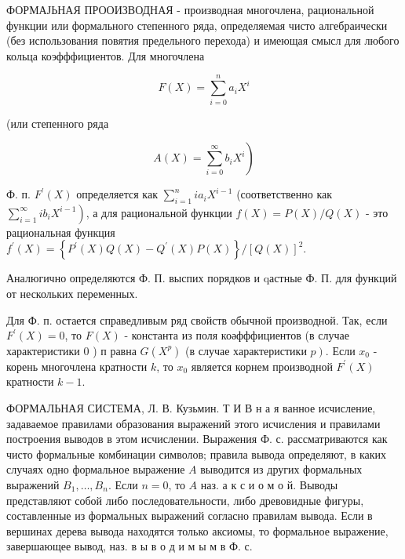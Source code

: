 \documentclass[10pt]{article}
\begin{document}
ФОРМАЈЬНАЯ ПРООИЗВОДНАЯ - производная многочлена, рациональной функции или формального степенного ряда, определяемая чисто алгебраически (без использования повятия предельного перехода) и имеющая смысл для любого кольца коэфффициентов. Для многочлена



\[

F(X)=\sum_{i=0}^{n} a_{i} X^{i}

\]



(или степенного ряда



\[

\left.A(X)=\sum_{i=0}^{\infty} b_{i} X^{i}\right)

\]



Ф. п. $F^{\prime}(X)$ определяется как $\sum_{i=1}^{n} i a_{i} X^{i-1}$ (соответственно как $\left.\sum_{i=1}^{\infty} i b_{i} X^{i-1}\right)$, а для рациональной функции $f(X)=P(X) / Q(X)$ - это рациональная функция $f^{\prime}(X)=\left\{P^{\prime}(X) Q(X)-Q^{\prime}(X) P(X)\right\} /[Q(X)]^{2}$.



Аналюгично определяются Ф. П. выспих порядков и qастные Ф. П. для функций от нескольких переменных.



Для Ф. п. остается справедливым ряд свойств обычной производной. Так, если $F^{\prime}(X)=0$, то $F(X)$ - константа из поля коәфффициентов (в случае характеристики 0 ) п равна $G\left(X^{p}\right)$ (в случае характеристики $\left.p\right)$. Если $x_{0}$ - корень многочлена кратности $k$, то $x_{0}$ является корнем производной $F^{\prime}(X)$ кратности $k-1$.



ФОРМАЛЬНАЯ СИСТЕМА, Л. В. Кузьмин. Т И В н а я ванное исчисление, задаваемое правилами образования выражений этого исчисления и правилами построения выводов в этом исчислении. Выражения Ф. с. рассматриваются как чисто формальные комбинации символов; правила вывода определяют, в каких случаях одно формальное выражение $A$ выводится из других формальных выражений $B_{1}, \ldots, B_{n}$. Если $n=0$, то $A$ наз. а к с и о м о й. Выводы представляют собой либо последовательности, либо древовидные фигуры, составленные из формальных выражений согласно правилам вывода. Если в вершинах дерева вывода находятся только аксиомы, то формальное выражение, завершающее вывод, наз. в ы в о д и м ы м в Ф. с.
\end{document}
